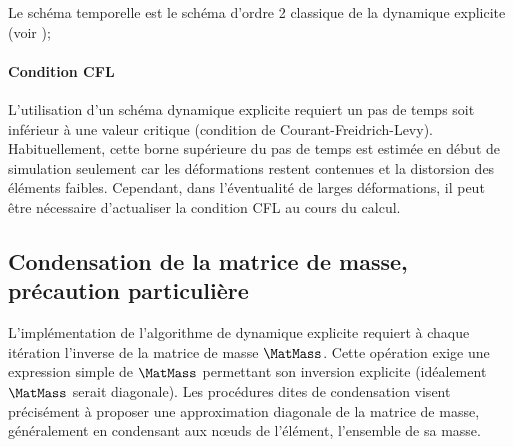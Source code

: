 \documentclass[10pt]{book}
\begin{document}
Le schéma temporelle est le schéma d'ordre 2 classique de la dynamique explicite (voir \cite{bonnet2007analyse});
\paragraph{Condition CFL} L'utilisation d'un schéma dynamique explicite requiert un pas de temps soit inférieur à une valeur critique (condition de Courant-Freidrich-Levy). Habituellement, cette borne supérieure du pas de temps est estimée en début de simulation seulement car les déformations restent contenues et la distorsion des éléments faibles. Cependant, dans l'éventualité de larges déformations, il peut être nécessaire d’actualiser la condition CFL au cours du calcul. 
\subsection{Condensation de la matrice de masse, précaution particulière}
L'implémentation de l'algorithme de dynamique explicite requiert à chaque itération l'inverse de la matrice de masse $\MatMass$. Cette opération exige une expression simple de $\MatMass$ permettant son inversion explicite (idéalement $\MatMass$ serait diagonale). Les procédures dites \og de condensation \fg{} visent précisément à proposer une approximation diagonale de la matrice de masse, généralement en \og condensant \fg{} aux nœuds de l’élément, l'ensemble de sa masse.\\
\end{document}
